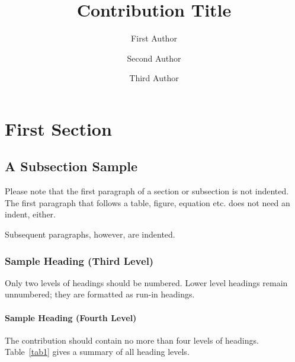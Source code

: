 \documentclass[runningheads]{llncs}
\begin{document}
%
\title{Contribution Title}
%
%
\author{First Author \and
    Second Author \and
    Third Author}
%
%
%
\maketitle              %
%

%
%
%
\section{First Section}
\subsection{A Subsection Sample}
Please note that the first paragraph of a section or subsection is
not indented. The first paragraph that follows a table, figure,
equation etc. does not need an indent, either. \textcite{example}

Subsequent paragraphs, however, are indented.

\subsubsection{Sample Heading (Third Level)} Only two levels of
headings should be numbered. Lower level headings remain unnumbered;
they are formatted as run-in headings.

\paragraph{Sample Heading (Fourth Level)}
The contribution should contain no more than four levels of
headings. Table~\ref{tab1} gives a summary of all heading levels.
\end{document}
